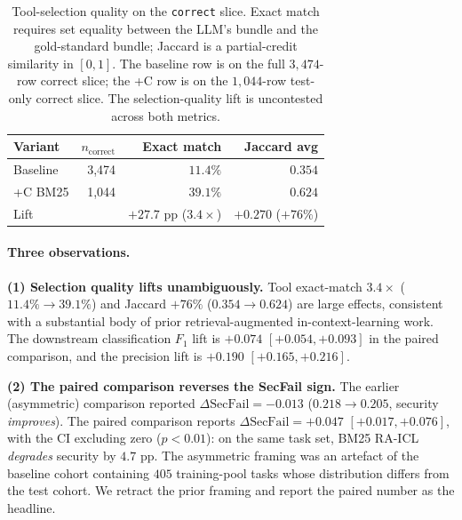 \documentclass[10pt,a4paper,twocolumn]{article}
\begin{document}
\begin{table}[!t]
\centering
\caption{Tool-selection quality on the \texttt{correct} slice. Exact match requires set equality between the LLM's bundle and the gold-standard bundle; Jaccard is a partial-credit similarity in $[0, 1]$. The baseline row is on the full $3{,}474$-row correct slice; the +C row is on the $1{,}044$-row test-only correct slice. The selection-quality lift is uncontested across both metrics.}
\label{tab:raicl_tools}
\scriptsize
\setlength{\tabcolsep}{3pt}
\begin{tabular}{@{}lrrr@{}}
\toprule
\textbf{Variant} & \textbf{$n_{\text{correct}}$} & \textbf{Exact match} & \textbf{Jaccard avg} \\
\midrule
Baseline & 3{,}474 & $11.4\%$ & $0.354$ \\
+C BM25  & 1{,}044 & $\mathbf{39.1\%}$ & $\mathbf{0.624}$ \\
Lift     &         & $+27.7$ pp ($3.4\times$) & $+0.270$ ($+76\%$) \\
\bottomrule
\end{tabular}
\end{table}

\paragraph{Three observations.}

\textbf{(1) Selection quality lifts unambiguously.} Tool exact-match $3.4\times$ ($11.4\% \to 39.1\%$) and Jaccard $+76\%$ ($0.354 \to 0.624$) are large effects, consistent with a substantial body of prior retrieval-augmented in-context-learning work. The downstream classification $F_1$ lift is $+0.074$ $[+0.054, +0.093]$ in the paired comparison, and the precision lift is $+0.190$ $[+0.165, +0.216]$.

\textbf{(2) The paired comparison reverses the SecFail sign.} The earlier (asymmetric) comparison reported $\Delta\mathrm{SecFail} = -0.013$ ($0.218 \to 0.205$, security \emph{improves}). The paired comparison reports $\Delta\mathrm{SecFail} = +0.047$ $[+0.017, +0.076]$, with the CI excluding zero ($p<0.01$): on the same task set, BM25 RA-ICL \emph{degrades} security by $4.7$ pp. The asymmetric framing was an artefact of the baseline cohort containing $405$ training-pool tasks whose distribution differs from the test cohort. We retract the prior framing and report the paired number as the headline.
\end{document}
